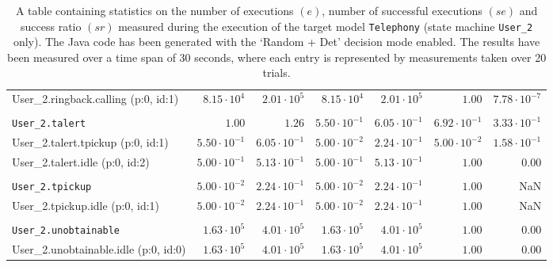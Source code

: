 \begin{table}[htbp]
{\begin{tabular}{lrrrrrr}
\hspace{3mm}User\_2.ringback.calling (p:0, id:1)     &  $8.15 \cdot 10^{4}$ &  $2.01 \cdot 10^{5}$ &  $8.15 \cdot 10^{4}$ &  $2.01 \cdot 10^{5}$ &               $1.00$ & $7.78 \cdot 10^{-7}$ \\
\\[-8pt]\texttt{User\_2.talert}                      &               $1.00$ &               $1.26$ & $5.50 \cdot 10^{-1}$ & $6.05 \cdot 10^{-1}$ & $6.92 \cdot 10^{-1}$ & $3.33 \cdot 10^{-1}$ \\
\hspace{3mm}User\_2.talert.tpickup (p:0, id:1)       & $5.50 \cdot 10^{-1}$ & $6.05 \cdot 10^{-1}$ & $5.00 \cdot 10^{-2}$ & $2.24 \cdot 10^{-1}$ & $5.00 \cdot 10^{-2}$ & $1.58 \cdot 10^{-1}$ \\
\hspace{3mm}User\_2.talert.idle (p:0, id:2)          & $5.00 \cdot 10^{-1}$ & $5.13 \cdot 10^{-1}$ & $5.00 \cdot 10^{-1}$ & $5.13 \cdot 10^{-1}$ &               $1.00$ &               $0.00$ \\
\\[-8pt]\texttt{User\_2.tpickup}                     & $5.00 \cdot 10^{-2}$ & $2.24 \cdot 10^{-1}$ & $5.00 \cdot 10^{-2}$ & $2.24 \cdot 10^{-1}$ &               $1.00$ &                  NaN \\
\hspace{3mm}User\_2.tpickup.idle (p:0, id:1)         & $5.00 \cdot 10^{-2}$ & $2.24 \cdot 10^{-1}$ & $5.00 \cdot 10^{-2}$ & $2.24 \cdot 10^{-1}$ &               $1.00$ &                  NaN \\
\\[-8pt]\texttt{User\_2.unobtainable}                &  $1.63 \cdot 10^{5}$ &  $4.01 \cdot 10^{5}$ &  $1.63 \cdot 10^{5}$ &  $4.01 \cdot 10^{5}$ &               $1.00$ &               $0.00$ \\
\hspace{3mm}User\_2.unobtainable.idle (p:0, id:0)    &  $1.63 \cdot 10^{5}$ &  $4.01 \cdot 10^{5}$ &  $1.63 \cdot 10^{5}$ &  $4.01 \cdot 10^{5}$ &               $1.00$ &               $0.00$ \\
\bottomrule
\end{tabular}
}
\caption{A table containing statistics on the number of executions $(e)$, number of successful executions $(se)$ and success ratio $(sr)$ measured during the execution of the target model \texttt{Telephony} (state machine \texttt{User\_2} only). The Java code has been generated with the `Random + Det' decision mode enabled. The results have been measured over a time span of 30 seconds, where each entry is represented by measurements taken over 20 trials.}
\label{table:frequency_results_telephony_random_det_user_2}
\end{table}